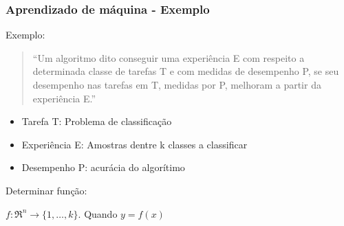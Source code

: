 \documentclass{beamer}
\begin{document}
\begin{frame}
    \frametitle{Aprendizado de máquina - Exemplo}
    Exemplo:  

    \begin{quotation}
        “Um algoritmo dito conseguir uma experiência E com respeito a determinada classe de tarefas T e com medidas de desempenho P, se seu desempenho nas tarefas em T, medidas por P, melhoram a partir da experiência E.” ~\cite{Mitchell97} 
        \end{quotation}

    \begin{itemize}
        \item Tarefa T: Problema de classificação
        \item Experiência E: Amostras dentre k classes a classificar
        \item Desempenho P: acurácia do algorítimo
    \end{itemize}
    
    Determinar função:

    \(f:\Re^n\rightarrow \{1,\ldots,k\}\). Quando \( y=f(x) \)
    \end{frame}
\end{document}

